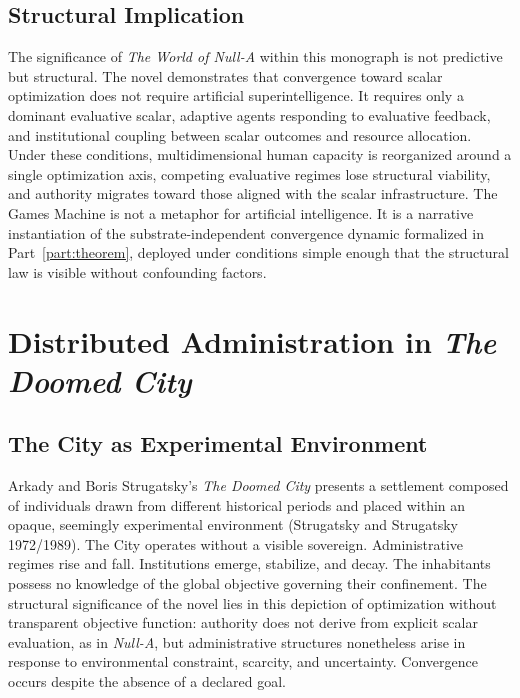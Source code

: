 \documentclass[12pt, oneside]{book}
\theoremstyle{plain}
\theoremstyle{definition}
\theoremstyle{remark}
\theoremstyle{definition}
\begin{document}
\subsection{Structural Implication}

The significance of \textit{The World of Null-A} within this monograph is not
predictive but structural. The novel demonstrates that convergence toward scalar
optimization does not require artificial superintelligence. It requires only a
dominant evaluative scalar, adaptive agents responding to evaluative feedback, and
institutional coupling between scalar outcomes and resource allocation. Under these
conditions, multidimensional human capacity is reorganized around a single optimization
axis, competing evaluative regimes lose structural viability, and authority migrates
toward those aligned with the scalar infrastructure. The Games Machine is not a
metaphor for artificial intelligence. It is a narrative instantiation of the
substrate-independent convergence dynamic formalized in Part~\ref{part:theorem},
deployed under conditions simple enough that the structural law is visible without
confounding factors.

\section{Distributed Administration in \textit{The Doomed City}}
\label{sec:doomedcity}

\subsection{The City as Experimental Environment}

Arkady and Boris Strugatsky's \textit{The Doomed City} presents a settlement
composed of individuals drawn from different historical periods and placed within an
opaque, seemingly experimental environment (Strugatsky and Strugatsky 1972/1989). The City operates
without a visible sovereign. Administrative regimes rise and fall. Institutions emerge,
stabilize, and decay. The inhabitants possess no knowledge of the global objective
governing their confinement. The structural significance of the novel lies in this
depiction of optimization without transparent objective function: authority does not
derive from explicit scalar evaluation, as in \textit{Null-A}, but administrative
structures nonetheless arise in response to environmental constraint, scarcity, and
uncertainty. Convergence occurs despite the absence of a declared goal.
\end{document}
